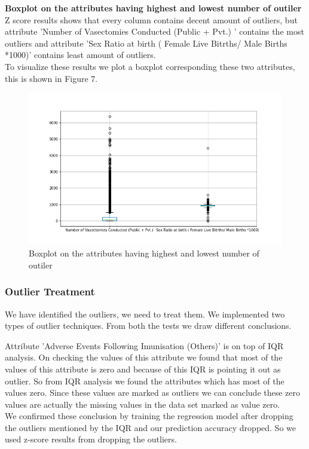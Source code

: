 \documentclass[12pt]{article}
\begin{document}
\pagebreak
\textbf{Boxplot on the attributes having highest and lowest number of outiler}\\

Z score results shows that every column contains decent amount of outliers, but attribute 'Number of Vasectomies Conducted (Public + Pvt.) ' contains the most outliers and attribute 'Sex Ratio at birth ( Female Live Bitrths/ Male Births *1000)' contains least amount of outliers.\\
To visualize these results we plot a boxplot corresponding these two attributes, this is shown in Figure 7.

\begin{figure}[h]
	\hspace{-1cm}
	\includegraphics[scale=0.8]{images/boxplot.png}
	\caption{Boxplot on the attributes having highest and lowest number of outiler}
\end{figure}

\pagebreak
\subsubsection{Outlier Treatment}

We have identified the outliers, we need to treat them. We implemented two types of outlier techniques. From both the tests we draw different conclusions.

Attribute 'Adverse Events Following Imunisation (Others)' is on top of IQR analysis. On checking the values of this attribute we found that most of the values of this attribute is zero and because of this IQR is pointing it out as outlier. So from IQR analysis we found the attributes which has most of the values zero. Since these values are marked as outliers we can conclude these zero values are actually the missing values in the data set marked as value zero.\\
We confirmed these conclusion by training the regression model after dropping the outliers mentioned by the IQR and our prediction accuracy dropped. So we used z-score results from dropping the outliers.\\
\end{document}
